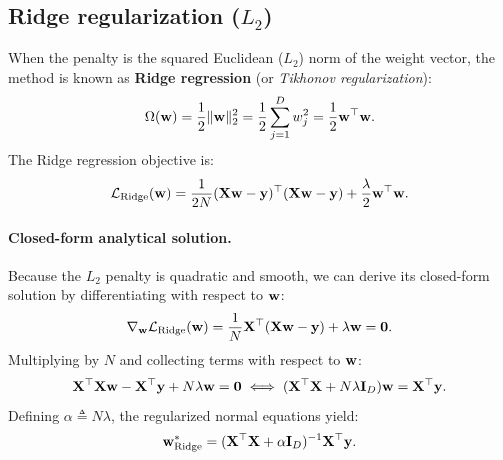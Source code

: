 \subsection{Ridge regularization ($L_2$)}
\label{sec:ridge_regression}

When the penalty is the squared Euclidean ($L_2$) norm of the weight vector, the method is known as \textbf{Ridge regression} (or \textit{Tikhonov regularization}):
\begin{equation}
\Omega(\mathbf{w}) = \frac{1}{2} \|\mathbf{w}\|_2^2 = \frac{1}{2} \sum_{j=1}^D w_j^2 = \frac{1}{2} \mathbf{w}^\top \mathbf{w}.
\label{eq:l2_penalty}
\end{equation}
The Ridge regression objective is:
\begin{equation}
\mathcal{L}_{\text{Ridge}}(\mathbf{w}) = \frac{1}{2N} (\mathbf{X}\mathbf{w} - \mathbf{y})^\top (\mathbf{X}\mathbf{w} - \mathbf{y}) + \frac{\lambda}{2} \mathbf{w}^\top \mathbf{w}.
\label{eq:ridge_objective}
\end{equation}

\paragraph{Closed-form analytical solution.}
Because the $L_2$ penalty is quadratic and smooth, we can derive its closed-form solution by differentiating with respect to $\mathbf{w}$:
\begin{equation}
\nabla_{\mathbf{w}} \mathcal{L}_{\text{Ridge}}(\mathbf{w}) = \frac{1}{N} \mathbf{X}^\top (\mathbf{X}\mathbf{w} - \mathbf{y}) + \lambda \mathbf{w} = \mathbf{0}.
\label{eq:ridge_gradient}
\end{equation}
Multiplying by $N$ and collecting terms with respect to $\mathbf{w}$:
\begin{equation}
\mathbf{X}^\top \mathbf{X} \mathbf{w} - \mathbf{X}^\top \mathbf{y} + N\lambda \mathbf{w} = \mathbf{0} \iff (\mathbf{X}^\top \mathbf{X} + N\lambda \mathbf{I}_D)\mathbf{w} = \mathbf{X}^\top \mathbf{y}.
\label{eq:ridge_rearranged}
\end{equation}
Defining $\alpha \triangleq N\lambda$, the regularized normal equations yield:
\begin{equation}
\mathbf{w}^*_{\text{Ridge}} = (\mathbf{X}^\top \mathbf{X} + \alpha \mathbf{I}_D)^{-1} \mathbf{X}^\top \mathbf{y}.
\label{eq:ridge_closed_form}
\end{equation}

